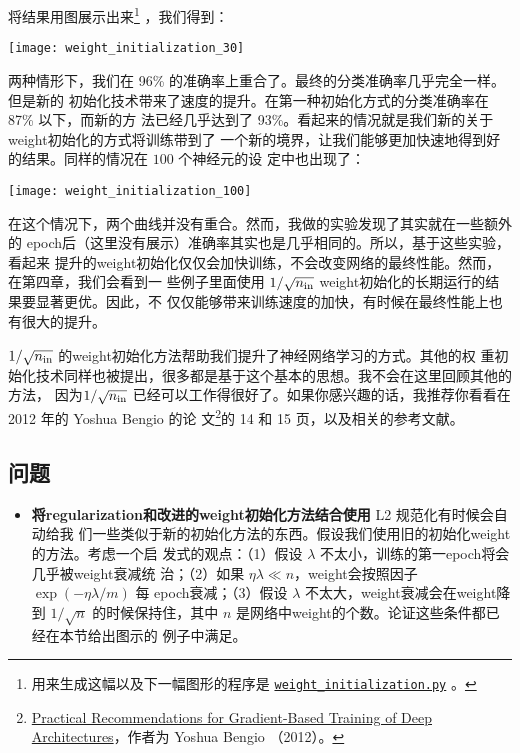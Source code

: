 将结果用图展示出来\footnote{用来生成这幅以及下一幅图形的程序是
  \href{https://github.com/mnielsen/neural-networks-and-deep-learning/blob/master/fig/weight_initialization.py}{\lstinline!weight_initialization.py!}
  。} ，我们得到：
\begin{center}
    \texttt{[image: weight\_initialization\_30]}
\end{center}

两种情形下，我们在 96\% 的准确率上重合了。最终的分类准确率几乎完全一样。但是新的
初始化技术带来了速度的提升。在第一种初始化方式的分类准确率在 87\% 以下，而新的方
法已经几乎达到了 93\%。看起来的情况就是我们新的关于\gls*{weight}初始化的方式将训练带到了
一个新的境界，让我们能够更加快速地得到好的结果。同样的情况在 $100$ 个神经元的设
定中也出现了：
\begin{center}
    \texttt{[image: weight\_initialization\_100]}
\end{center}

在这个情况下，两个曲线并没有重合。然而，我做的实验发现了其实就在一些额外的%
\gls*{epoch}后（这里没有展示）准确率其实也是几乎相同的。所以，基于这些实验，看起来
提升的\gls*{weight}初始化仅仅会加快训练，不会改变网络的最终性能。然而，在第四章，我们会看到一
些例子里面使用 $1/\sqrt{n_{\rm in}}$ \gls*{weight}初始化的长期运行的结果要显著更优。因此，不
仅仅能够带来训练速度的加快，有时候在最终性能上也有很大的提升。

$1/\sqrt{n_{\rm in}}$ 的\gls*{weight}初始化方法帮助我们提升了神经网络学习的方式。其他的权
重初始化技术同样也被提出，很多都是基于这个基本的思想。我不会在这里回顾其他的方法，
因为$1/\sqrt{n_{\rm in}}$ 已经可以工作得很好了。如果你感兴趣的话，我推荐你看看在
2012 年的 Yoshua Bengio 的论
文\footnote{\href{http://arxiv.org/pdf/1206.5533v2.pdf}{Practical
    Recommendations for Gradient-Based Training of Deep Architectures}，作者为
  Yoshua Bengio （2012）。}的 14 和 15 页，以及相关的参考文献。

\subsection*{问题}

\begin{itemize}
\item \textbf{将\gls*{regularization}和改进的\gls*{weight}初始化方法结合使用} L2 规范化有时候会自动给我
  们一些类似于新的初始化方法的东西。假设我们使用旧的初始化\gls*{weight}的方法。考虑一个启
  发式的观点：（1）假设 $\lambda$ 不太小，训练的第一\gls*{epoch}将会几乎被\gls*{weight}衰减统
  治；（2）如果 $\eta \lambda \ll n$，\gls*{weight}会按照因子 $\exp(-\eta \lambda / m)$ 每
  \gls*{epoch}衰减；（3）假设 $\lambda$ 不太大，\gls*{weight}衰减会在\gls*{weight}降到 $1/\sqrt{n}$
  的时候保持住，其中 $n$ 是网络中\gls*{weight}的个数。论证这些条件都已经在本节给出图示的
  例子中满足。
\end{itemize}

